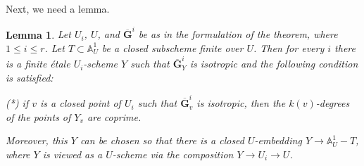 \documentclass[11pt]{amsart}
\newcommand\A{\mathbb A}
\theoremstyle{plain}
\newtheorem{lemma}[proposition]{Lemma}
\theoremstyle{definition}
\theoremstyle{remark}
\newcommand\bG{{\mathbf G}}
\begin{document}
Next, we need a lemma.

\begin{lemma}\label{lm:isotropic}
Let $U_i$, $U$, and $\overline{\bG}^i$ be as in the formulation of the theorem, where $1\le i\le r$. Let $T\subset\A^1_U$ be a closed subscheme finite over $U$. Then for every $i$ there is a finite \'etale $U_i$-scheme $Y$ such that $\overline{\bG}^i_Y$ is isotropic and the following condition is satisfied:

(*) if $v$ is a closed point of $U_i$ such that $\overline{\bG}^i_v$ is isotropic, then the $k(v)$-degrees of the points of $Y_v$ are coprime.

Moreover, this $Y$ can be chosen so that there is a closed $U$-embedding $Y\to\A^1_U-T$, where $Y$ is viewed as a $U$-scheme via the composition $Y\to U_i\to U$.
\end{lemma}
\end{document}
